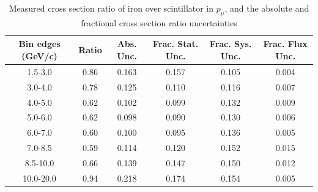 \documentclass[../main.tex]{subfiles}
\begin{document}
\begin{table}
  \centering
  \renewcommand{\arraystretch}{1.15}
  \caption{Measured cross section ratio of iron over scintillator in $p_{\mu}$, and the absolute and fractional cross section ratio uncertainties}
    \begin{tabular}{c||c|c||c|c|c}
      Bin edges (GeV/c) &  Ratio  &  Abs. Unc.  &  Frac. Stat. Unc.  &  Frac. Sys. Unc.  &  Frac. Flux Unc. \\
      \hline
      \hline
      1.5-3.0 & 0.86 & 0.163 & 0.157 & 0.105 & 0.004\\
      3.0-4.0 & 0.78 & 0.125 & 0.110 & 0.116 & 0.007\\
      4.0-5.0 & 0.62 & 0.102 & 0.099 & 0.132 & 0.009\\
      5.0-6.0 & 0.62 & 0.098 & 0.090 & 0.130 & 0.006\\
      6.0-7.0 & 0.60 & 0.100 & 0.095 & 0.136 & 0.005\\
      7.0-8.5 & 0.59 & 0.114 & 0.120 & 0.152 & 0.015\\
      8.5-10.0 & 0.66 & 0.139 & 0.147 & 0.150 & 0.012\\
      10.0-20.0 & 0.94 & 0.218 & 0.174 & 0.154 & 0.005
    \end{tabular}
  \label{tbl:rationucleonnuc26muon_pa}
\end{table}
\begin{table}
  \centering
  \renewcommand{\arraystretch}{1.15}
  \caption{Statistical covariance matrix of measured cross section ratio of iron over scintillator in $p_{\mu}$}
  \label{tbl:rationucleonnuc26muon_pb}
\end{table}
\end{document}
